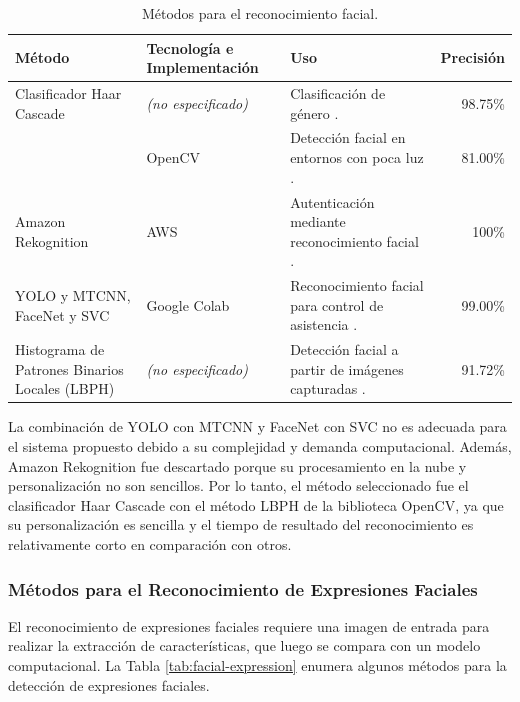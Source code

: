 \documentclass[a4paper,fleqn]{cas-sc}
\begin{document}
		\begin{table}[hbt]
			\caption{Métodos para el reconocimiento facial.}
			\label{tab:facial-recognition}
			\centering
			\begin{tabular}{p{}p{}p{}p{}}
				\hline
				\multicolumn{1}{l}{\textbf{Método}} & \multicolumn{1}{l}{\textbf{Tecnología e Implementación}} & \multicolumn{1}{l}{\textbf{Uso}} & \multicolumn{1}{l}{\textbf{Precisión}} \\ \hline
				Clasificador Haar Cascade & \textit{(no especificado)} & Clasificación de género \citep{Priyanka2012Hybrid}. & \multicolumn{1}{r}{98.75\%} \\
				& OpenCV & Detección facial en entornos con poca luz \citep{Le2022Facial}. & \multicolumn{1}{r}{81.00\%} \\
				Amazon Rekognition & AWS & Autenticación mediante reconocimiento facial \citep{Girmay2021AI}. & \multicolumn{1}{r}{100\%} \\
				YOLO y MTCNN, FaceNet y SVC & Google Colab & Reconocimiento facial para control de asistencia \citep{Darapaneni2020Automatic}. & \multicolumn{1}{r}{99.00\%} \\
				Histograma de Patrones Binarios Locales (LBPH) & \textit{(no especificado)} & Detección facial a partir de imágenes capturadas \citep{Garcia2021Application}. & \multicolumn{1}{r}{91.72\%} \\ \hline
			\end{tabular}
		\end{table}
		La combinación de YOLO con MTCNN y FaceNet con SVC no es adecuada para el sistema propuesto debido a su complejidad y demanda computacional. Además, Amazon Rekognition fue descartado porque su procesamiento en la nube y personalización no son sencillos. Por lo tanto, el método seleccionado fue el clasificador Haar Cascade con el método LBPH de la biblioteca OpenCV, ya que su personalización es sencilla y el tiempo de resultado del reconocimiento es relativamente corto en comparación con otros.
		
		\subsubsection*{Métodos para el Reconocimiento de Expresiones Faciales}				
		El reconocimiento de expresiones faciales requiere una imagen de entrada para realizar la extracción de características, que luego se compara con un modelo computacional. La Tabla \ref{tab:facial-expression} enumera algunos métodos para la detección de expresiones faciales.
		
\end{document}
